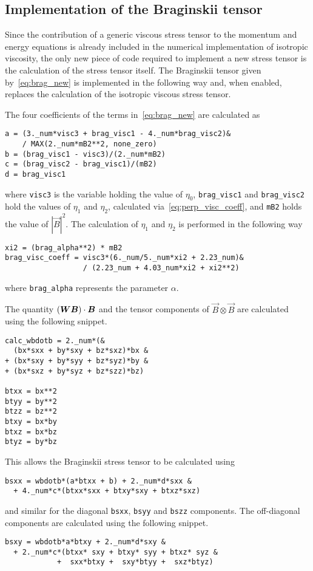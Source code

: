 \subsection{Implementation of the Braginskii tensor}

Since the contribution of a generic viscous stress tensor to the momentum and energy equations is already included in the numerical implementation of isotropic viscosity, the only new piece of code required to implement a new stress tensor is the calculation of the stress tensor itself. The Braginskii tensor given by~\eqref{eq:brag_new} is implemented in the following way and, when enabled, replaces the calculation of the isotropic viscous stress tensor. 

The four coefficients of the terms in~\eqref{eq:brag_new} are calculated as
\begin{lstlisting}
a = (3._num*visc3 + brag_visc1 - 4._num*brag_visc2)&
    / MAX(2._num*mB2**2, none_zero)
b = (brag_visc1 - visc3)/(2._num*mB2)
c = (brag_visc2 - brag_visc1)/(mB2)
d = brag_visc1
\end{lstlisting}
where \verb|visc3| is the variable holding the value of $\eta_0$, \verb|brag_visc1| and \verb|brag_visc2| hold the values of $\eta_1$ and $\eta_2$, calculated via~\eqref{eq:perp_visc_coeff}, and \verb|mB2| holds the value of $|\vec{B}|^2$. The calculation of $\eta_1$ and $\eta_2$ is performed in the following way
\begin{lstlisting}
xi2 = (brag_alpha**2) * mB2
brag_visc_coeff = visc3*(6._num/5._num*xi2 + 2.23_num)&
                  / (2.23_num + 4.03_num*xi2 + xi2**2)
\end{lstlisting}
where \verb|brag_alpha| represents the parameter $\alpha$.

The quantity $({\bm W} {\bm B}) \cdot {\bm B}$ and the tensor components of $\vec{B} \otimes \vec{B}$ are calculated using the following snippet.
\begin{lstlisting}
calc_wbdotb = 2._num*(&
  (bx*sxx + by*sxy + bz*sxz)*bx &
+ (bx*sxy + by*syy + bz*syz)*by &
+ (bx*sxz + by*syz + bz*szz)*bz)

btxx = bx**2
btyy = by**2
btzz = bz**2
btxy = bx*by
btxz = bx*bz
btyz = by*bz
\end{lstlisting}

This allows the Braginskii stress tensor to be calculated using
\begin{lstlisting}
bsxx = wbdotb*(a*btxx + b) + 2._num*d*sxx &
  + 4._num*c*(btxx*sxx + btxy*sxy + btxz*sxz)
\end{lstlisting}
and similar for the diagonal \verb|bsxx|, \verb|bsyy| and \verb|bszz| components. The off-diagonal components are calculated using the following snippet.
\begin{lstlisting}
bsxy = wbdotb*a*btxy + 2._num*d*sxy &
  + 2._num*c*(btxx* sxy + btxy* syy + btxz* syz &
            +  sxx*btxy +  sxy*btyy +  sxz*btyz)
\end{lstlisting}

